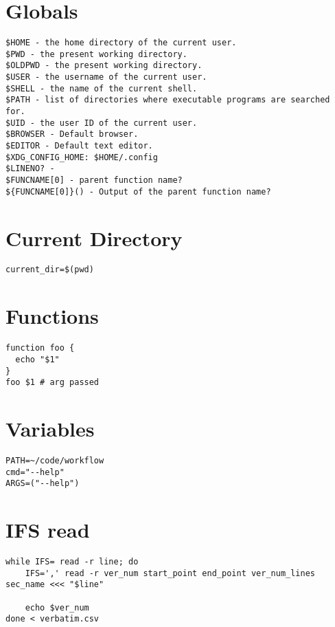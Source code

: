 \section{Globals}

\begin{verbatim}
$HOME - the home directory of the current user.
$PWD - the present working directory.
$OLDPWD - the present working directory.
$USER - the username of the current user.
$SHELL - the name of the current shell.
$PATH - list of directories where executable programs are searched for.
$UID - the user ID of the current user.
$BROWSER - Default browser.
$EDITOR - Default text editor.
$XDG_CONFIG_HOME: $HOME/.config
$LINENO? -
$FUNCNAME[0] - parent function name?
${FUNCNAME[0]}() - Output of the parent function name?
\end{verbatim}

\section{Current Directory}

\begin{verbatim}
current_dir=$(pwd)
\end{verbatim}

\section{Functions}

\begin{verbatim}
function foo {
  echo "$1"
}
foo $1 # arg passed
\end{verbatim}


\section{Variables}

\begin{verbatim}
PATH=~/code/workflow
cmd="--help"
ARGS=("--help")
\end{verbatim}


\section{IFS read}

\begin{verbatim}
while IFS= read -r line; do
    IFS=',' read -r ver_num start_point end_point ver_num_lines sec_name <<< "$line"
    
    echo $ver_num
done < verbatim.csv
\end{verbatim}

